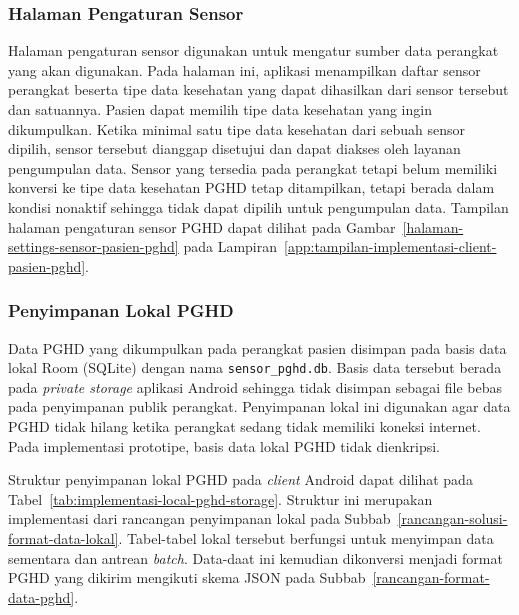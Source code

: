\subsubsection{Halaman Pengaturan Sensor}

Halaman pengaturan sensor digunakan untuk mengatur sumber data perangkat yang akan digunakan. 
Pada halaman ini, aplikasi menampilkan daftar sensor perangkat beserta tipe data kesehatan yang dapat dihasilkan dari sensor tersebut dan satuannya. 
Pasien dapat memilih tipe data kesehatan yang ingin dikumpulkan. 
Ketika minimal satu tipe data kesehatan dari sebuah sensor dipilih, sensor tersebut dianggap disetujui dan dapat diakses oleh layanan pengumpulan data. 
Sensor yang tersedia pada perangkat tetapi belum memiliki konversi ke tipe data kesehatan PGHD tetap ditampilkan, tetapi berada dalam kondisi nonaktif sehingga tidak dapat dipilih untuk pengumpulan data.
Tampilan halaman pengaturan sensor PGHD dapat dilihat pada Gambar~\ref{halaman-settings-sensor-pasien-pghd} pada Lampiran~\ref{app:tampilan-implementasi-client-pasien-pghd}.

\subsubsection{Penyimpanan Lokal PGHD}

Data PGHD yang dikumpulkan pada perangkat pasien disimpan pada basis data lokal Room (SQLite) dengan nama \texttt{sensor\_pghd.db}. 
Basis data tersebut berada pada \textit{private storage} aplikasi Android sehingga tidak disimpan sebagai file bebas pada penyimpanan publik perangkat. 
Penyimpanan lokal ini digunakan agar data PGHD tidak hilang ketika perangkat sedang tidak memiliki koneksi internet. 
Pada implementasi prototipe, basis data lokal PGHD tidak dienkripsi.

Struktur penyimpanan lokal PGHD pada \textit{client} Android dapat dilihat pada Tabel~\ref{tab:implementasi-local-pghd-storage}. 
Struktur ini merupakan implementasi dari rancangan penyimpanan lokal pada Subbab~\ref{rancangan-solusi-format-data-lokal}. 
Tabel-tabel lokal tersebut berfungsi untuk menyimpan data sementara dan antrean \textit{batch}.
Data-daat ini kemudian dikonversi menjadi format PGHD yang dikirim mengikuti skema JSON pada Subbab~\ref{rancangan-format-data-pghd}.

